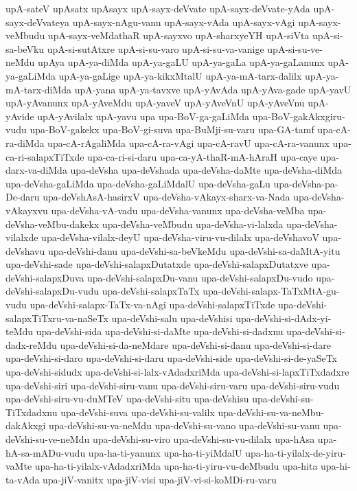 {upA-sateV
upAsatx
upAsayx
upA-sayx-deVvate
upA-sayx-deVvate-yAda
upA-sayx-deVvateya
upA-sayx-nAgu-vanu
upA-sayx-vAda
upA-sayx-vAgi
upA-sayx-veMbudu
upA-sayx-veMdathaR
upA-sayxvo
upA-sharxyeYH
upA-siVta
upA-si-sa-beVku
upA-si-sutAtxre
upA-si-su-varo
upA-si-su-va-vanige
upA-si-su-ve-neMdu
upAya
upA-ya-diMda
upA-ya-gaLU
upA-ya-gaLa
upA-ya-gaLanunx
upA-ya-gaLiMda
upA-ya-gaLige
upA-ya-kikxMtalU
upA-ya-mA-tarx-dalilx
upA-ya-mA-tarx-diMda
upA-yana
upA-ya-tavxve
upA-yAvAda
upA-yAva-gade
upA-yavU
upA-yAvanunx
upA-yAveMdu
upA-yaveV
upA-yAveVnU
upA-yAveVnu
upA-yAvide
upA-yAvilalx
upA-yavu
upa
upa-BoV-ga-gaLiMda
upa-BoV-gakAkxgiru-vudu
upa-BoV-gakekx
upa-BoV-gi-suva
upa-BuMji-su-varu
upa-GA-tamf
upa-cA-ra-diMda
upa-cA-rAgaliMda
upa-cA-ra-vAgi
upa-cA-ravU
upa-cA-ra-vanunx
upa-ca-ri-salapxTiTxde
upa-ca-ri-si-daru
upa-ca-yA-thaR-mA-hAraH
upa-caye
upa-darx-va-diMda
upa-deVsha
upa-deVshada
upa-deVsha-daMte
upa-deVsha-diMda
upa-deVsha-gaLiMda
upa-deVsha-gaLiMdalU
upa-deVsha-gaLu
upa-deVsha-pa-De-daru
upa-deVshAsA-hasirxV
upa-deVsha-vAkayx-sharx-va-Nada
upa-deVsha-vAkayxvu
upa-deVsha-vA-vadu
upa-deVsha-vanunx
upa-deVsha-veMba
upa-deVsha-veMbu-dakekx
upa-deVsha-veMbudu
upa-deVsha-vi-lalxda
upa-deVsha-vilalxde
upa-deVsha-vilalx-deyU
upa-deVsha-viru-vu-dilalx
upa-deVshavoV
upa-deVshavu
upa-deVshi-danu
upa-deVshi-sa-beVkeMdu
upa-deVshi-sa-daMtA-yitu
upa-deVshi-sade
upa-deVshi-salapxDutatxde
upa-deVshi-salapxDutatxve
upa-deVshi-salapxDuva
upa-deVshi-salapxDu-vanu
upa-deVshi-salapxDu-vudo
upa-deVshi-salapxDu-vudu
upa-deVshi-salapxTaTx
upa-deVshi-salapx-TaTxMtA-gu-vudu
upa-deVshi-salapx-TaTx-va-nAgi
upa-deVshi-salapxTiTxde
upa-deVshi-salapxTiTxru-va-naSeTx
upa-deVshi-salu
upa-deVshisi
upa-deVshi-si-dAdx-yi-teMdu
upa-deVshi-sida
upa-deVshi-si-daMte
upa-deVshi-si-dadxnu
upa-deVshi-si-dadx-reMdu
upa-deVshi-si-da-neMdare
upa-deVshi-si-danu
upa-deVshi-si-dare
upa-deVshi-si-daro
upa-deVshi-si-daru
upa-deVshi-side
upa-deVshi-si-de-yaSeTx
upa-deVshi-sidudx
upa-deVshi-si-lalx-vAdadxriMda
upa-deVshi-si-lapxTiTxdadxre
upa-deVshi-siri
upa-deVshi-siru-vanu
upa-deVshi-siru-varu
upa-deVshi-siru-vudu
upa-deVshi-siru-vu-duMTeV
upa-deVshi-situ
upa-deVshisu
upa-deVshi-su-TiTxdadxnu
upa-deVshi-suva
upa-deVshi-su-valilx
upa-deVshi-su-va-neMbu-dakAkxgi
upa-deVshi-su-va-neMdu
upa-deVshi-su-vano
upa-deVshi-su-vanu
upa-deVshi-su-ve-neMdu
upa-deVshi-su-viro
upa-deVshi-su-vu-dilalx
upa-hAsa
upa-hA-sa-mADu-vudu
upa-ha-ti-yanunx
upa-ha-ti-yiMdalU
upa-ha-ti-yilalx-de-yiru-vaMte
upa-ha-ti-yilalx-vAdadxriMda
upa-ha-ti-yiru-vu-deMbudu
upa-hita
upa-hi-ta-vAda
upa-jiV-vanitx
upa-jiV-visi
upa-jiV-vi-si-koMDi-ru-varu
}
